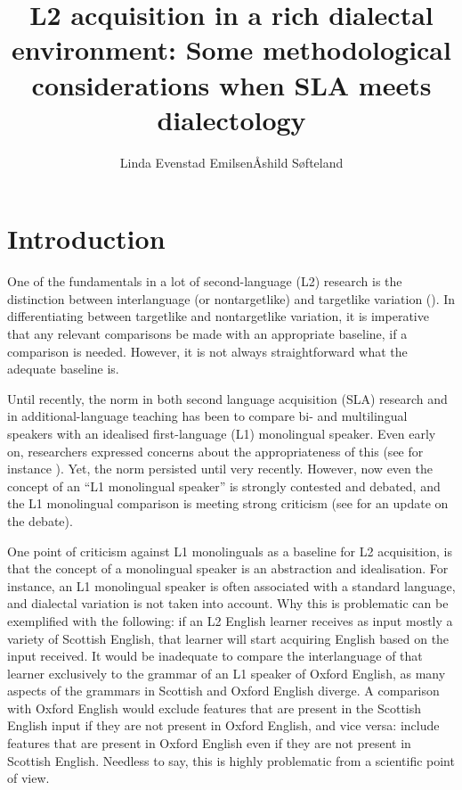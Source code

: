 \documentclass[output=paper,colorlinks,citecolor=brown,modfonts,nonflat]{../langscibook}
\author{Linda Evenstad Emilsen\affiliation{Østfold University College}\orcid{}\lastand Åshild Søfteland\affiliation{Østfold University College}\orcid{}}
\title{L2 acquisition in a rich dialectal environment: Some methodological considerations when SLA meets dialectology}
\begin{document}
\maketitle
\vspace*{-3cm}
\newpage

\section{Introduction}

One of the fundamentals in a lot of second-language (L2) research is the distinction between interlanguage (or nontargetlike) and targetlike variation (\citealt{GassMadden1985}). In differentiating between targetlike and nontargetlike variation, it is imperative that any relevant comparisons be made with an appropriate baseline, if a comparison is needed. However, it is not always straightforward what the adequate baseline is. 

Until recently, the norm in both second language acquisition (SLA) research and in additional-language teaching has been to compare bi- and multilingual speakers with an idealised first-language (L1) monolingual speaker. Even early on, researchers expressed concerns about the appropriateness of this (see for instance \citealt{Bley-Vroman1983, Klein1998}). Yet, the norm persisted until very recently. However, now even the concept of an “L1 monolingual speaker” is strongly contested and debated, and the L1 monolingual comparison is meeting strong criticism (see  \citealt{TheDouglasFirGroup2016} for an update on the debate).

One point of criticism against L1 monolinguals as a baseline for L2 acquisition, is that the concept of a monolingual speaker is an abstraction and idealisation. For instance, an L1 monolingual speaker is often associated with a standard language, and dialectal variation is not taken into account. Why this is problematic can be exemplified with the following: if an L2 English learner receives as input mostly a variety of {Scottish English}, that learner will start acquiring English based on the input received. It would be inadequate to compare the interlanguage of that learner exclusively to the grammar of an L1 speaker of Oxford English, as many aspects of the grammars in Scottish and Oxford English diverge. A comparison with Oxford English would exclude features that are present in the {Scottish English} input if they are not present in Oxford English, and vice versa: include features that are present in Oxford English even if they are not present in {Scottish English}. Needless to say, this is highly problematic from a scientific point of view.
\end{document}
